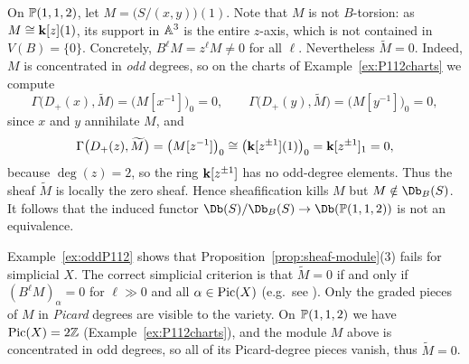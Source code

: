 \documentclass{amsart}
\begin{document}
\begin{example}\label{ex:oddP112}
  On $\mathbb P(1,1,2)$, let $M=\bigl(S/(x,y)\bigr)(1)$. Note that $M$ is not $B$-torsion: as $M\cong{\bf k}[z](1)$, its support in $\mathbb A^3$ is the entire $z$-axis, which is not contained in $V(B)=\{0\}$.  Concretely, $B^\ell M=z^\ell M\neq0$ for all $\ell$. Nevertheless $\widetilde M=0$. Indeed, $M$ is concentrated in \emph{odd} degrees, so on the charts of Example~\ref{ex:P112charts} we compute
  \[
  \Gamma\bigl(D_+(x),\widetilde M\bigr)=\bigl(M[x^{-1}]\bigr)_0=0, \qquad
  \Gamma\bigl(D_+(y),\widetilde M\bigr)=\bigl(M[y^{-1}]\bigr)_0=0,
  \]
  since $x$ and $y$ annihilate $M$, and
  \[
  \Gamma\bigl(D_+(z),\widetilde M\bigr)=\bigl(M[z^{-1}]\bigr)_0\cong\bigl({\bf k}[z^{\pm1}](1)\bigr)_0={\bf k}[z^{\pm1}]_1=0,
  \]
  because $\deg(z)=2$, so the ring ${\bf k}[z^{\pm1}]$ has no odd-degree elements. Thus the sheaf $\widetilde{M}$ is locally the zero sheaf.  Hence sheafification kills $M$ but $M\notin \Db_B(S)$.  It follows that the induced functor $\Db(S)/\Db_B(S)\to \Db(\PP(1,1,2))$ is not an equivalence.
\end{example}

\begin{remark}\label{rem:simplicialsheaf}
  Example~\ref{ex:oddP112} shows that Proposition~\ref{prop:sheaf-module}(3) fails for simplicial $X$. The correct simplicial criterion is that $\widetilde M=0$ if and only if $\left(B^\ell M\right)_\alpha=0$ for $\ell\gg0$ and all $\alpha\in\operatorname{Pic}(X)$ (e.g.~see \cite[Exc.~5.3.5]{CLS2011}). Only the graded pieces of $M$ in \emph{Picard} degrees are visible to the variety. On $\mathbb P(1,1,2)$ we have $\operatorname{Pic}(X) = 2\mathbb Z$ (Example~\ref{ex:P112charts}), and the module $M$ above is concentrated in odd degrees, so all of its Picard-degree pieces vanish, thus $\widetilde M=0$.
\end{remark}



\end{document}

